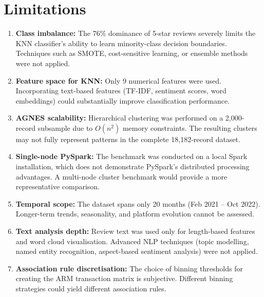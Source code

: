 \documentclass[12pt,a4paper]{article}
\begin{document}
\section{Limitations}

\begin{enumerate}
    \item \textbf{Class imbalance:} The 76\% dominance of 5-star reviews severely limits the KNN classifier's ability to learn minority-class decision boundaries. Techniques such as SMOTE, cost-sensitive learning, or ensemble methods were not applied.

    \item \textbf{Feature space for KNN:} Only 9 numerical features were used. Incorporating text-based features (TF-IDF, sentiment scores, word embeddings) could substantially improve classification performance.

    \item \textbf{AGNES scalability:} Hierarchical clustering was performed on a 2{,}000-record subsample due to $O(n^2)$ memory constraints. The resulting clusters may not fully represent patterns in the complete 18{,}182-record dataset.

    \item \textbf{Single-node PySpark:} The benchmark was conducted on a local Spark installation, which does not demonstrate PySpark's distributed processing advantages. A multi-node cluster benchmark would provide a more representative comparison.

    \item \textbf{Temporal scope:} The dataset spans only 20 months (Feb 2021 -- Oct 2022). Longer-term trends, seasonality, and platform evolution cannot be assessed.

    \item \textbf{Text analysis depth:} Review text was used only for length-based features and word cloud visualisation. Advanced NLP techniques (topic modelling, named entity recognition, aspect-based sentiment analysis) were not applied.

    \item \textbf{Association rule discretisation:} The choice of binning thresholds for creating the ARM transaction matrix is subjective. Different binning strategies could yield different association rules.
\end{enumerate}

\end{document}
